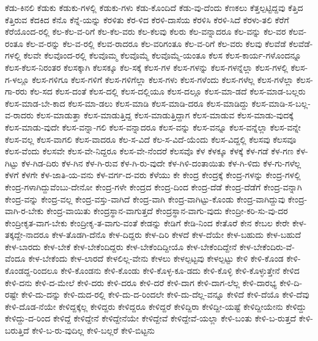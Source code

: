 {ಕೆಡು-ಕಿನಲಿ
ಕೆಡುಕು
ಕೆಡುಕು-ಗಳಲ್ಲಿ
ಕೆಡುಕು-ಗಳು
ಕೆಡು-ಕೊಂದಿದೆ
ಕೆಡು-ವು-ದೆಂದು
ಕೆಣಕಲು
ಕೆತ್ತಲ್ಪಟ್ಟಿದ್ದವು
ಕೆತ್ತಿದ
ಕೆತ್ತಿರುವ
ಕೆದಕಿದ
ಕೆನೊ
ಕೆನ್ನೆ-ಯನ್ನು
ಕೆರಳಿತು
ಕೆರ-ಳಿದ
ಕೆರಳಿ-ದಾಸೆಯ
ಕೆರಳಿಸಿ
ಕೆರಳಿ-ಸಿದೆ
ಕೆರಳು-ತಲಿ
ಕೆರೆಗೆ
ಕೆರೆಯೊಂದ-ರಲ್ಲಿ
ಕೆಲ-ಕೆಲ-ವ-ರಿಗೆ
ಕೆಲ-ಕೆಲ-ವರು
ಕೆಲ-ಕೆಲವು
ಕೆಲರು
ಕೆಲ-ವನ್ನಾದರೂ
ಕೆಲ-ವನ್ನು
ಕೆಲ-ವರ
ಕೆಲವ-ರಂತೂ
ಕೆಲ-ವ-ರನ್ನು
ಕೆಲ-ವ-ರಲ್ಲಿ
ಕೆಲವ-ರಾದರೂ
ಕೆಲ-ವರಿಗಂತೂ
ಕೆಲ-ವ-ರಿಗೆ
ಕೆಲ-ವರು
ಕೆಲವು
ಕೆಲವೆಡೆ
ಕೆಲವೆಡೆ-ಗಳಲ್ಲಿ
ಕೆಲವೇ
ಕೆಲವೊಂದ-ರಲ್ಲಿ
ಕೆಲವೊಮ್ಮ
ಕೆಲವೊಮ್ಮೆ
ಕೆಲವೊಮ್ಮೆ-ಯಂತೂ
ಕೆಲಸ
ಕೆಲಸ-ಕಾರ್ಯ-ಗಳೊಂದನ್ನೂ
ಕೆಲಸ-ಕೆಲಸ-ನಿರಂತರ
ಕೆಲಸಕ್ಕಾಗಿ
ಕೆಲಸಕ್ಕೂ
ಕೆಲ-ಸಕ್ಕೆ
ಕೆಲಸ-ಗಳ
ಕೆಲಸ-ಗಳನ್ನು
ಕೆಲಸ-ಗಳನ್ನೆಲ್ಲಾ
ಕೆಲಸ-ಗಳಲ್ಲಿ
ಕೆಲಸ-ಗ-ಳಲ್ಲೂ
ಕೆಲಸ-ಗಳಿಗೂ
ಕೆಲಸ-ಗಳಿಗೆ
ಕೆಲಸ-ಗಳಿಗೆಲ್ಲಾ
ಕೆಲಸ-ಗಳು
ಕೆಲಸ-ಗಳೆಂದು
ಕೆಲಸ-ಗಳೆಲ್ಲ
ಕೆಲಸ-ಗಳೆಲ್ಲಾ
ಕೆಲಸ-ಗಾ-ರರು
ಕೆಲ-ಸದ
ಕೆಲಸ-ದಂತೆ
ಕೆಲಸ-ದಲ್ಲಿ
ಕೆಲಸ-ದಲ್ಲಿಯೂ
ಕೆಲಸ-ದಲ್ಲೂ
ಕೆಲಸ-ಮಾ-ಡದೆ
ಕೆಲಸ-ಮಾಡ-ಬಲ್ಲರು
ಕೆಲಸ-ಮಾಡ-ಬೇ-ಕಾದ
ಕೆಲಸ-ಮಾ-ಡಲು
ಕೆಲಸ-ಮಾಡಿ
ಕೆಲಸ-ಮಾಡಿ-ದರೂ
ಕೆಲಸ-ಮಾಡಿದ್ದು
ಕೆಲಸ-ಮಾಡಿ-ಸ-ಬಲ್ಲ-ವ-ರಾದರು
ಕೆಲಸ-ಮಾಡುತ್ತಾ
ಕೆಲಸ-ಮಾಡುತ್ತಿದ್ದ
ಕೆಲಸ-ಮಾಡುತ್ತಿದ್ದಾಗ
ಕೆಲಸ-ಮಾಡುವ
ಕೆಲಸ-ಮಾಡು-ವುದಕ್ಕೆ
ಕೆಲಸ-ಮಾಡು-ವುದೇ
ಕೆಲಸ-ವನ್ನಾ-ಗಲಿ
ಕೆಲಸ-ವನ್ನಾದರೂ
ಕೆಲಸ-ವನ್ನು
ಕೆಲಸ-ವನ್ನೂ
ಕೆಲಸ-ವನ್ನೆಲ್ಲಾ
ಕೆಲಸ-ವನ್ನೇ
ಕೆಲಸ-ವಲ್ಲ
ಕೆಲಸ-ವಾಗಲಿ
ಕೆಲಸ-ವಾದರೂ
ಕೆಲ-ಸ-ವಿದೆ
ಕೆಲ-ಸ-ವಿದೆ-ಯೆಂದು
ಕೆಲಸ-ವಿದ್ದಲ್ಲಿ
ಕೆಲಸವು
ಕೆಲಸವೂ
ಕೆಲಸ-ವೆಂದು
ಕೆಲಸವೇ
ಕೆಲಸ-ವೇ-ನಿದ್ದರೂ
ಕೆಲಸ-ವೇ-ನೆಂದರೆ
ಕೆಲಸವೊ
ಕೆಳ
ಕೆಳಕ್ಕೂ
ಕೆಳಕ್ಕೆ
ಕೆಳ-ಗಡೆ
ಕೆಳ-ಗಣ
ಕೆಳ-ಗಿಟ್ಟು
ಕೆಳ-ಗಿಡ-ದಿರು
ಕೆಳ-ಗಿನ
ಕೆಳ-ಗಿ-ರುವ
ಕೆಳ-ಗಿ-ರು-ವುದೇ
ಕೆಳ-ಗಿಳಿ-ದಂತಾಯಿತು
ಕೆಳ-ಗಿ-ಳಿದು
ಕೆಳ-ಗು-ಗಳೆಲ್ಲ
ಕೆಳಗೆ
ಕೆಳಗೇ
ಕೆಳ-ಜಾತಿ-ಯ-ವನು
ಕೆಳ-ವರ್ಗ-ದ-ವರು
ಕೆಳೆಯು
ಕೇ
ಕೇಂದ್ರ
ಕೇಂದ್ರಕ್ಕೆ
ಕೇಂದ್ರ-ಗಳನ್ನು
ಕೇಂದ್ರ-ಗಳಲ್ಲಿ
ಕೇಂದ್ರ-ಗಳಾಗಿದ್ದುವೆಂಬು-ದೇನೋ
ಕೇಂದ್ರ-ಗಳೇ
ಕೇಂದ್ರದ
ಕೇಂದ್ರ-ದಿಂದ
ಕೇಂದ್ರ-ದೆಡೆ
ಕೇಂದ್ರ-ದೆಡೆಗೆ
ಕೇಂದ್ರ-ವನ್ನಾಗಿ
ಕೇಂದ್ರ-ವನ್ನು
ಕೇಂದ್ರ-ವಲ್ಲ
ಕೇಂದ್ರ-ವಸ್ತು-ವಾಗಿದೆ
ಕೇಂದ್ರ-ವಾಗಿ
ಕೇಂದ್ರ-ವಾಗಿಟ್ಟು-ಕೊಂಡು
ಕೇಂದ್ರ-ವಾಗಿದ್ದುವು
ಕೇಂದ್ರ-ವಾಗಿ-ರ-ಬೇಕು
ಕೇಂದ್ರ-ವಾಯಿತು
ಕೇಂದ್ರಸ್ಥಾನ-ವಾಗುತ್ತದೆ
ಕೇಂದ್ರಸ್ಥಾನ-ವಾಗು-ವುದು
ಕೇಂದ್ರೀ-ಕರಿ-ಸು-ವು-ದರ
ಕೇಂದ್ರೀಕೃತ-ವಾಗ-ಬೇಕು
ಕೇಂದ್ರೀಕೃ-ತ-ವಾಗು-ವಂತೆ
ಕೇಡನ್ನು
ಕೇಡಿಗೆ
ಕೇಡಿ-ನಿಂದ
ಕೇತೊರೆ
ಕೇನ
ಕೇಬಲ
ಕೇರೇ
ಕೇಳ-ತಕ್ಕದ್ದೇ-ನಾದರೂ
ಕೇಳ-ತೊಡಗಿ-ದೆನೊ
ಕೇಳ-ದಿದ್ದರು
ಕೇಳ-ದಿರಿ
ಕೇಳದೆ
ಕೇಳ-ದೆಯೇ
ಕೇಳ-ಬಹುದು
ಕೇಳ-ಬಹುದೆ
ಕೇಳ-ಬಾರದು
ಕೇಳ-ಬೇಕೆ
ಕೇಳ-ಬೇಕೆಂದಿದ್ದರು
ಕೇಳ-ಬೇಕೆಂದಿದ್ದೀಯೊ
ಕೇಳ-ಬೇಕೆಂದಿದ್ದೇನೆ
ಕೇಳ-ಬೇಕೆಂದಿರು-ವೆ-ವೆಂದೂ
ಕೇಳ-ಬೇಕೆಂದು
ಕೇಳ-ಲಾರದೆ
ಕೇಳಲಿಲ್ಲ-ವೇನು
ಕೇಳಲು
ಕೇಳಲ್ಪಟ್ಟವು
ಕೇಳಲ್ಪಟ್ಟು
ಕೇಳಿ
ಕೇಳಿ-ಕೊಂಡ
ಕೇಳಿ-ಕೊಂಡದ್ದ-ರಿಂದಲೂ
ಕೇಳಿ-ಕೊಂಡನು
ಕೇಳಿ-ಕೊಂಡು
ಕೇಳಿ-ಕೊಳ್ಳ-ಕೂ-ಡದು
ಕೇಳಿ-ಕೊಳ್ಳಿ
ಕೇಳಿ-ಕೊಳ್ಳುತ್ತೇನೆ
ಕೇಳಿದ
ಕೇಳಿ-ದನು
ಕೇಳಿ-ದ-ಮೇಲೆ
ಕೇಳಿ-ದರು
ಕೇಳಿ-ದರೂ
ಕೇಳಿ-ದರೆ
ಕೇಳಿ-ದಾಗ
ಕೇಳಿ-ದಾಗ-ಲೆಲ್ಲ
ಕೇಳಿ-ದಾರಭ್ಯ
ಕೇಳಿ-ದಿ-ರಷ್ಟೇ
ಕೇಳಿ-ದು-ದನ್ನು
ಕೇಳಿ-ದುದ-ರಲ್ಲಿ
ಕೇಳಿ-ದು-ದ-ರಿಂದಲೇ
ಕೇಳಿ-ದು-ದೆಲ್ಲ-ವನ್ನೂ
ಕೇಳಿದೆ
ಕೇಳಿ-ದೆಯೊ
ಕೇಳಿ-ದೆವು
ಕೇಳಿ-ದೊಡ-ನೆಯೇ
ಕೇಳಿದ್ದಕ್ಕೆಲ್ಲ
ಕೇಳಿದ್ದರು
ಕೇಳಿದ್ದರೂ
ಕೇಳಿದ್ದರೆ
ಕೇಳಿದ್ದಿರಾ
ಕೇಳಿದ್ದೀ-ಯಷ್ಟೆ
ಕೇಳಿದ್ದೀಯೇನು
ಕೇಳಿದ್ದು
ಕೇಳಿದ್ದು-ದ-ರಿಂದ
ಕೇಳಿದ್ದೆ
ಕೇಳಿದ್ದೇನೆ
ಕೇಳಿದ್ದೇನೆಯೇ
ಕೇಳಿದ್ದೇವೆ
ಕೇಳಿದ್ದೇವೆ-ಯಲ್ಲಾ
ಕೇಳಿ-ಬಂತು
ಕೇಳಿ-ಬ-ರುತ್ತದೆ
ಕೇಳಿ-ಬರುತ್ತಿದೆ
ಕೇಳಿ-ಬ-ರು-ವುದಿಲ್ಲ
ಕೇಳಿ-ಬಲ್ಲರೆ
ಕೇಳಿ-ಬಿಟ್ಟನು
}
